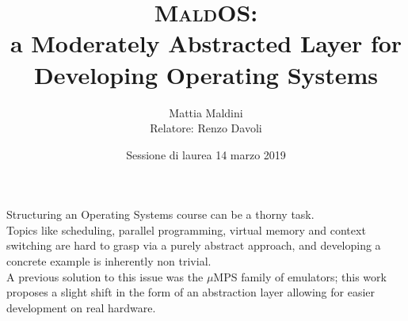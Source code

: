 \documentclass[table,xcdraw]{beamer}
\begin{document}
\title[MaldOS] %
{{\huge\textsc{MaldOS}:} \\
a Moderately Abstracted Layer for Developing Operating Systems}
\author[Mattia Maldini] %
{Mattia Maldini\\[3mm]Relatore: Renzo Davoli\\[3mm]}

\date[Laurea 2019] %
{Sessione di laurea 14 marzo 2019}
\subject{Informatica}

\frame{\titlepage}

\begin{frame}
    Structuring an Operating Systems course can be a thorny task. \\
    \bigskip
    Topics like
    scheduling, parallel programming, virtual memory and context switching are 
    hard to grasp via a purely abstract approach, and developing a concrete 
    example is inherently non trivial.\\
    \bigskip
    A previous solution to this issue was the $\mu$MPS family of emulators; this
    work proposes a slight shift in the form of an abstraction layer allowing for
    easier development on real hardware.

\end{frame}
\end{document}
